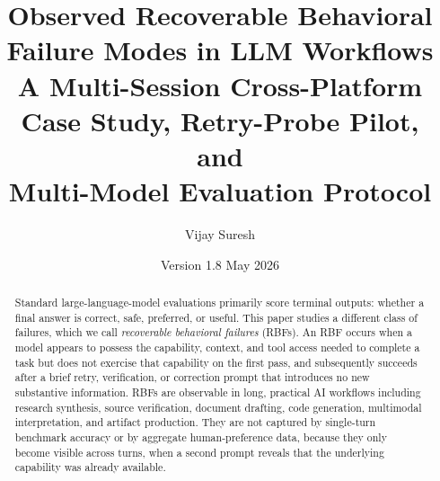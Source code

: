 \documentclass[11pt]{article}
\title{\textbf{Observed Recoverable Behavioral Failure Modes in LLM Workflows}\\
       \large A Multi-Session Cross-Platform Case Study, Retry-Probe Pilot, and\\
       Multi-Model Evaluation Protocol}
\author{Vijay Suresh}
\date{Version 1.8 \quad May 2026}
\begin{document}
\maketitle

\begin{abstract}
Standard large-language-model evaluations primarily score terminal outputs: whether a final answer is correct, safe, preferred, or useful. This paper studies a different class of failures, which we call \emph{recoverable behavioral failures} (RBFs). An RBF occurs when a model appears to possess the capability, context, and tool access needed to complete a task but does not exercise that capability on the first pass, and subsequently succeeds after a brief retry, verification, or correction prompt that introduces no new substantive information. RBFs are observable in long, practical AI workflows including research synthesis, source verification, document drafting, code generation, multimodal interpretation, and artifact production. They are not captured by single-turn benchmark accuracy or by aggregate human-preference data, because they only become visible across turns, when a second prompt reveals that the underlying capability was already available.


\end{abstract}
\end{document}

